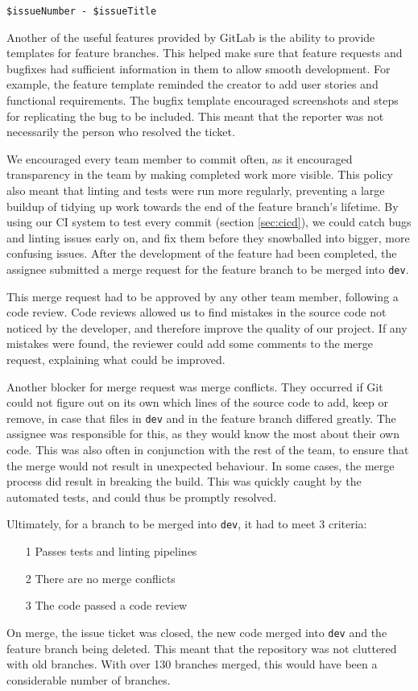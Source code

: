 \documentclass{l3proj}
\begin{document}
 \texttt{\$issueNumber - \$issueTitle}

Another of the useful features provided by GitLab is the ability to 
 provide templates for feature branches. This helped make sure that 
 feature requests and bugfixes had sufficient information in them to
 allow smooth development. For example, the feature template reminded
 the creator to add user stories and functional requirements. The bugfix
 template encouraged screenshots and steps for replicating the bug to be
 included. This meant that the reporter was not necessarily the person who
 resolved the ticket.
 
We encouraged every team member to commit often, as it encouraged transparency
 in the team by making completed work more visible. This policy also meant 
 that linting and tests were run more regularly, preventing a large buildup
 of tidying up work towards the end of the feature branch's lifetime.
 By using our CI system to test every commit (section \ref{sec:cicd}), we could
 catch bugs and linting issues early on, and fix them before they snowballed into
 bigger, more confusing issues. After the development of the feature had been completed, the assignee
 submitted a merge request for the feature branch to be merged into \texttt{dev}.
 
This merge request had to be approved by any other team member, following a
 code review. Code reviews allowed us to find mistakes in the source code not
 noticed by the developer, and therefore improve the quality of our project.
 If any mistakes were found, the reviewer could add some comments to the merge
 request, explaining what could be improved. 
 
Another blocker for merge request was merge conflicts. They occurred if Git could not
 figure out on its own which lines of the source code to add, keep or
 remove, in case that files in \texttt{dev} and in the feature branch differed
 greatly. The assignee was responsible for this, as they would know the most about their
 own code. This was also often in conjunction with the rest of the team, to ensure that the merge
 would not result in unexpected behaviour. In some cases, the merge process did result
 in breaking the build. This was quickly caught by the automated tests, and could
 thus be promptly resolved. 
 
Ultimately, for a branch to be merged into \texttt{dev}, it had to meet 3 criteria:
\begin{itemize}
\item[1] Passes tests and linting pipelines
\item[2] There are no merge conflicts
\item[3] The code passed a code review
\end{itemize}
On merge, the issue ticket was closed, the new code merged into \texttt{dev}
 and the feature branch being deleted. This meant that the repository was not 
 cluttered with old branches. With over 130 branches merged, this would have been
 a considerable number of branches.
\end{document}
